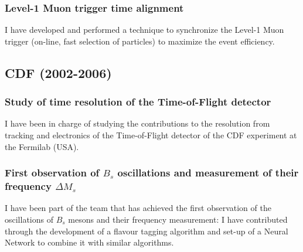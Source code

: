 \documentclass{article}
\begin{document}
\begin{vita}
\subsubsection*{Level-1 Muon trigger time alignment}
I have developed and performed a technique to synchronize the Level-1 Muon trigger (on-line, fast selection of particles) to maximize the event efficiency. 

\subsection*{CDF (2002-2006)}
\subsubsection*{Study of time resolution of the Time-of-Flight detector}
I have been in charge of studying the contributions to the resolution from tracking and electronics of the Time-of-Flight detector of the CDF experiment at the Fermilab (USA). 

\subsubsection*{First observation of $B_{s}$ oscillations and measurement of their frequency $\Delta M_{s}$}
I have been part of the team that has achieved the first observation of the oscillations of $B_{s}$ mesons and their frequency measurement: I have contributed through the development of a flavour tagging algorithm and set-up of a Neural Network to combine it with similar algorithms.
\end{vita}


%

\end{document}

